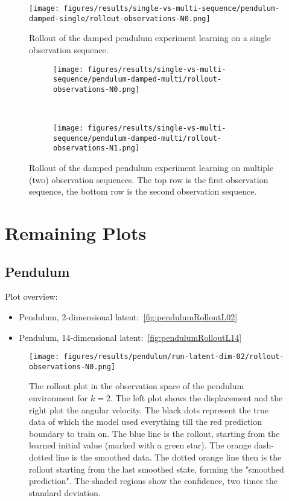 	\begin{figure}
		\centering
		\texttt{[image: figures/results/single-vs-multi-sequence/pendulum-damped-single/rollout-observations-N0.png]}
		\caption[Rollout of the damped pendulum experiment learning on a single observation sequence]{Rollout of the damped pendulum experiment learning on a single observation sequence.}
		\label{fig:plotsSingleSequence}
	\end{figure}
	\begin{figure}
		\centering
		\begin{subfigure}{\linewidth}
			\texttt{[image: figures/results/single-vs-multi-sequence/pendulum-damped-multi/rollout-observations-N0.png]}
		\end{subfigure} \\
		\begin{subfigure}{\linewidth}
			\texttt{[image: figures/results/single-vs-multi-sequence/pendulum-damped-multi/rollout-observations-N1.png]}
		\end{subfigure}
		\caption[Rollout of the damped pendulum experiment learning on two observation sequences]{Rollout of the damped pendulum experiment learning on multiple (two) observation sequences. The top row is the first observation sequence, the bottom row is the second observation sequence.}
		\label{fig:plotsMultiSequence}
	\end{figure}

\section{Remaining Plots}
	\label{app:remainingPlots}

	\subsection{Pendulum}
		Plot overview:
		\begin{itemize}
			\item Pendulum, 2-dimensional latent:~\autoref{fig:pendulumRolloutL02}
			\item Pendulum, 14-dimensional latent:~\autoref{fig:pendulumRolloutL14}
		\end{itemize}

		\begin{figure}
			\centering
			\texttt{[image: figures/results/pendulum/run-latent-dim-02/rollout-observations-N0.png]}
			\caption[Rollout of the pendulum experiment for 2 latent dimensions]{The rollout plot in the observation space of the pendulum environment for \(k = 2\). The left plot shows the displacement and the right plot the angular velocity. The black dots represent the true data of which the model used everything till the red prediction boundary to train on. The blue line is the rollout, starting from the learned initial value (marked with a green star). The orange dash-dotted line is the smoothed data. The dotted orange line then is the rollout starting from the last smoothed state, forming the "smoothed prediction". The shaded regions show the confidence, \ie two times the standard deviation.}
			\label{fig:pendulumRolloutL02}
		\end{figure}

